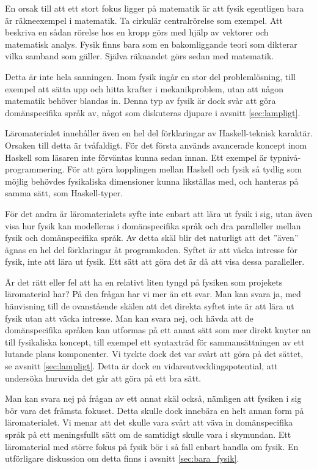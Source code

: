 \begin{binge}
En orsak till att ett stort fokus ligger på matematik är att fysik egentligen
bara är räkneexempel i matematik. Ta cirkulär centralrörelse som exempel. Att
beskriva en sådan rörelse hos en kropp görs med hjälp av vektorer och
matematisk analys. Fysik finns bara som en bakomliggande teori som dikterar
vilka samband som gäller. Själva räknandet görs sedan med matematik.

Detta är inte hela sanningen. Inom fysik ingår en stor del problemlösning, till
exempel att sätta upp och hitta krafter i mekanikproblem, utan att någon
matematik behöver blandas in. Denna typ av fysik är dock svår att göra
domänspecifika språk av, något som diskuteras djupare i avsnitt
\ref{sec:lampligt}.

Läromaterialet innehåller även en hel del förklaringar av Haskell-teknisk
karaktär. Orsaken till detta är tvåfaldigt. För det första
används avancerade koncept inom Haskell som läsaren inte förväntas kunna sedan
innan. Ett exempel är typnivå-programmering. För att göra kopplingen mellan
Haskell och fysik så tydlig som möjlig behövdes fysikaliska dimensioner kunna
likställas med, och hanteras på samma sätt, som Haskell-typer.

För det andra är läromaterialets syfte inte enbart att lära ut fysik i sig,
utan även visa hur fysik kan modelleras i domänspecifika språk och dra
paralleller mellan fysik och domänspecifika språk. Av detta skäl blir det
naturligt att det ''även'' ägnas en hel del förklaringar åt programkoden.
Syftet är att väcka intresse för fysik, inte att lära ut fysik. Ett sätt att
göra det är då att visa dessa paralleller.

Är det rätt eller fel att ha en relativt liten tyngd på fysiken som projekets
läromaterial har? På den frågan har vi mer än ett svar. Man kan svara ja, med
hänvisning till de ovanstående skälen att det direkta syftet inte är att lära
ut fysik utan att väcka intresse. Man kan svara nej, och hävda att de
domänspecifika språken kan utformas på ett annat sätt som mer direkt
knyter an till fysikaliska koncept, till exempel ett syntaxträd för
sammansättningen av ett lutande plans komponenter. Vi tyckte dock det var svårt
att göra på det sättet, se avsnitt \ref{sec:lampligt}. Detta är dock en
vidareutvecklingspotential, att undersöka huruvida det går att göra på ett bra
sätt.

Man kan svara nej på frågan av ett annat skäl också, nämligen att fysiken i sig
bör vara det främsta fokuset. Detta skulle dock innebära en helt annan form på
läromaterialet. Vi menar att det skulle vara svårt att väva in domänspecifika
språk på ett meningsfullt sätt om de samtidigt skulle vara i skymundan. Ett
läromaterial med större fokus på fysik bör i så fall enbart handla om fysik. En
utförligare diskussion om detta finns i avsnitt \ref{sec:bara_fysik}.


\end{binge}
